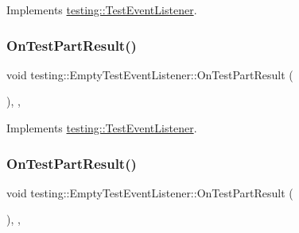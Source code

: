Implements \mbox{\hyperlink{classtesting_1_1_test_event_listener_a054f8705c883fa120b91473aff38f2ee}{testing\+::\+Test\+Event\+Listener}}.

\mbox{\label{classtesting_1_1_empty_test_event_listener_ab95992f0a0b3741d59a24c3a7115fa60}} 
\subsubsection{\texorpdfstring{OnTestPartResult()}{OnTestPartResult()}\hspace{0.1cm}{\footnotesize\ttfamily [2/3]}}
{\footnotesize\ttfamily void testing\+::\+Empty\+Test\+Event\+Listener\+::\+On\+Test\+Part\+Result (\begin{DoxyParamCaption}\item[{const Test\+Part\+Result \&}]{ }\end{DoxyParamCaption})\hspace{0.3cm}{\ttfamily [inline]}, {\ttfamily [override]}, {\ttfamily [virtual]}}



Implements \mbox{\hyperlink{classtesting_1_1_test_event_listener_a054f8705c883fa120b91473aff38f2ee}{testing\+::\+Test\+Event\+Listener}}.

\mbox{\label{classtesting_1_1_empty_test_event_listener_ab95992f0a0b3741d59a24c3a7115fa60}} 
\subsubsection{\texorpdfstring{OnTestPartResult()}{OnTestPartResult()}\hspace{0.1cm}{\footnotesize\ttfamily [3/3]}}
{\footnotesize\ttfamily void testing\+::\+Empty\+Test\+Event\+Listener\+::\+On\+Test\+Part\+Result (\begin{DoxyParamCaption}\item[{const Test\+Part\+Result \&}]{ }\end{DoxyParamCaption})\hspace{0.3cm}{\ttfamily [inline]}, {\ttfamily [override]}, {\ttfamily [virtual]}}



